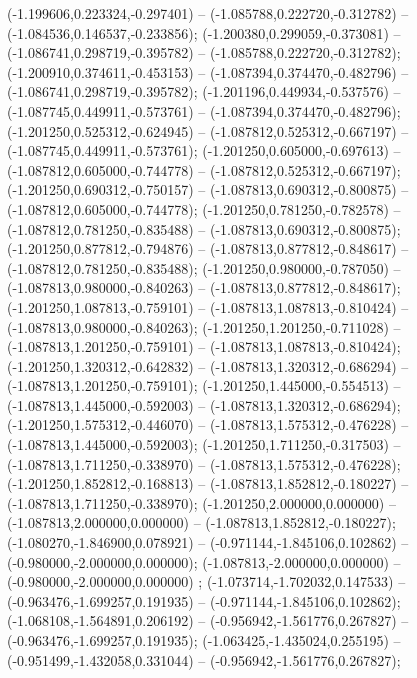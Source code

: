  (-1.199606,0.223324,-0.297401) -- (-1.085788,0.222720,-0.312782) -- (-1.084536,0.146537,-0.233856);
 (-1.200380,0.299059,-0.373081) -- (-1.086741,0.298719,-0.395782) -- (-1.085788,0.222720,-0.312782);
 (-1.200910,0.374611,-0.453153) -- (-1.087394,0.374470,-0.482796) -- (-1.086741,0.298719,-0.395782);
 (-1.201196,0.449934,-0.537576) -- (-1.087745,0.449911,-0.573761) -- (-1.087394,0.374470,-0.482796);
 (-1.201250,0.525312,-0.624945) -- (-1.087812,0.525312,-0.667197) -- (-1.087745,0.449911,-0.573761);
 (-1.201250,0.605000,-0.697613) -- (-1.087812,0.605000,-0.744778) -- (-1.087812,0.525312,-0.667197);
 (-1.201250,0.690312,-0.750157) -- (-1.087813,0.690312,-0.800875) -- (-1.087812,0.605000,-0.744778);
 (-1.201250,0.781250,-0.782578) -- (-1.087812,0.781250,-0.835488) -- (-1.087813,0.690312,-0.800875);
 (-1.201250,0.877812,-0.794876) -- (-1.087813,0.877812,-0.848617) -- (-1.087812,0.781250,-0.835488);
 (-1.201250,0.980000,-0.787050) -- (-1.087813,0.980000,-0.840263) -- (-1.087813,0.877812,-0.848617);
 (-1.201250,1.087813,-0.759101) -- (-1.087813,1.087813,-0.810424) -- (-1.087813,0.980000,-0.840263);
 (-1.201250,1.201250,-0.711028) -- (-1.087813,1.201250,-0.759101) -- (-1.087813,1.087813,-0.810424);
 (-1.201250,1.320312,-0.642832) -- (-1.087813,1.320312,-0.686294) -- (-1.087813,1.201250,-0.759101);
 (-1.201250,1.445000,-0.554513) -- (-1.087813,1.445000,-0.592003) -- (-1.087813,1.320312,-0.686294);
 (-1.201250,1.575312,-0.446070) -- (-1.087813,1.575312,-0.476228) -- (-1.087813,1.445000,-0.592003);
 (-1.201250,1.711250,-0.317503) -- (-1.087813,1.711250,-0.338970) -- (-1.087813,1.575312,-0.476228);
 (-1.201250,1.852812,-0.168813) -- (-1.087813,1.852812,-0.180227) -- (-1.087813,1.711250,-0.338970);
 (-1.201250,2.000000,0.000000) -- (-1.087813,2.000000,0.000000) -- (-1.087813,1.852812,-0.180227);
 (-1.080270,-1.846900,0.078921) -- (-0.971144,-1.845106,0.102862) -- (-0.980000,-2.000000,0.000000);
 (-1.087813,-2.000000,0.000000) -- (-0.980000,-2.000000,0.000000) ;
 (-1.073714,-1.702032,0.147533) -- (-0.963476,-1.699257,0.191935) -- (-0.971144,-1.845106,0.102862);
 (-1.068108,-1.564891,0.206192) -- (-0.956942,-1.561776,0.267827) -- (-0.963476,-1.699257,0.191935);
 (-1.063425,-1.435024,0.255195) -- (-0.951499,-1.432058,0.331044) -- (-0.956942,-1.561776,0.267827);
